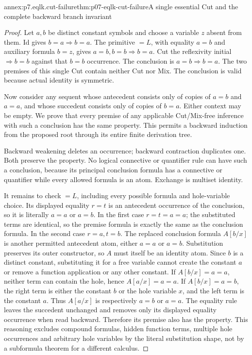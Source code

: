 \begin{annexitem}{annex:p7.eqlk.cut-failure}{thm:p07-eqlk-cut-failure}{A single essential Cut and the complete backward branch invariant}
\begin{proof}
Let \(a,b\) be distinct constant symbols and choose a variable \(z\)
absent from them. Id gives \(b=a\Rightarrow b=a\).
The primitive \(=L\), with equality \(a=b\) and auxiliary formula
\(b=z\), gives \(a=b,b=b\Rightarrow b=a\). Cut the reflexivity
initial \(\Rightarrow b=b\) against that \(b=b\) occurrence. The
conclusion is \(a=b\Rightarrow b=a\). The two premises of this
single Cut contain neither Cut nor Mix. The conclusion is valid because
actual identity is symmetric.

Now consider any sequent whose antecedent consists only of copies of
\(a=b\) and \(a=a\), and whose succedent consists only of copies
of \(b=a\). Either context may be empty. We prove that every premise
of any applicable Cut/Mix-free inference with such a conclusion has
the same property. This permits a backward induction from the proposed
root through its entire finite derivation tree.

Backward weakening deletes an occurrence; backward contraction duplicates
one. Both preserve the property. No logical connective or quantifier
rule can have such a conclusion, because its principal conclusion
formula has a connective or quantifier while every allowed formula is
an atom. Exchange is multiset identity.

It remains to check \(=L\), including every possible formula and
hole-variable choice. Its displayed equality \(r=t\) is an antecedent
occurrence of the conclusion, so it is literally \(a=a\) or \(a=b\).
In the first case \(r=t=a=a\); the substituted terms are identical,
so the premise formula is exactly the same as the conclusion formula.
In the second case \(r=a,t=b\). The replaced conclusion formula
\(A[b/x]\) is another permitted antecedent atom, either \(a=a\)
or \(a=b\). Substitution preserves its outer constructor, so \(A\)
must itself be an identity atom. Since \(b\) is a distinct constant,
substituting it for a free variable cannot create the constant \(a\)
or remove a function application or any other constant. If
\(A[b/x]=a=a\), neither term can contain the hole, hence
\(A[a/x]=a=a\). If \(A[b/x]=a=b\), the right term is either
the constant \(b\) or the hole variable \(x\), and the left term is
the constant \(a\). Thus \(A[a/x]\) is respectively \(a=b\)
or \(a=a\). The equality rule leaves the succedent unchanged and
removes only its displayed equality occurrence when read backward.
Therefore its premise also has the property. This reasoning excludes
compound formulas, hidden function terms, multiple hole occurrences
and arbitrary hole variables by the literal substitution shape, not
by a subformula theorem for a different calculus.


\end{proof}
\end{annexitem}

